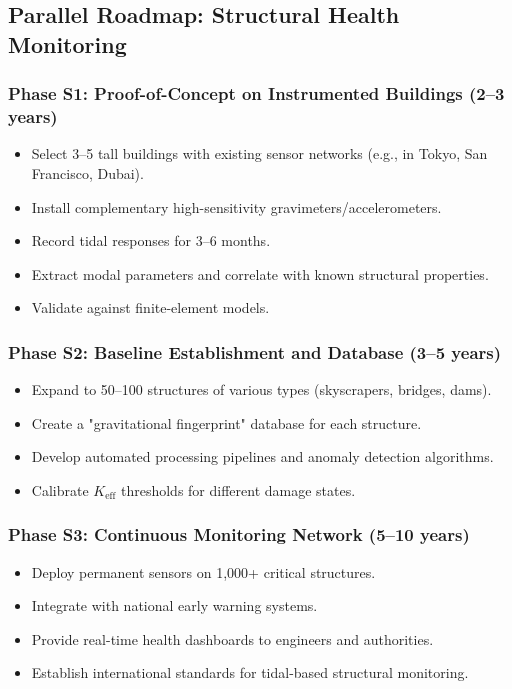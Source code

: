 \documentclass[12pt,a4paper]{article}
\theoremstyle{remark}
\begin{document}
	\subsection{Parallel Roadmap: Structural Health Monitoring}
	
	\subsubsection{Phase S1: Proof-of-Concept on Instrumented Buildings (2–3 years)}
	
	\begin{itemize}
		\item Select 3–5 tall buildings with existing sensor networks (e.g., in Tokyo, San Francisco, Dubai).
		\item Install complementary high-sensitivity gravimeters/accelerometers.
		\item Record tidal responses for 3–6 months.
		\item Extract modal parameters and correlate with known structural properties.
		\item Validate against finite-element models.
	\end{itemize}
	
	\subsubsection{Phase S2: Baseline Establishment and Database (3–5 years)}
	
	\begin{itemize}
		\item Expand to 50–100 structures of various types (skyscrapers, bridges, dams).
		\item Create a "gravitational fingerprint" database for each structure.
		\item Develop automated processing pipelines and anomaly detection algorithms.
		\item Calibrate \(K_{\mathrm{eff}}\) thresholds for different damage states.
	\end{itemize}
	
	\subsubsection{Phase S3: Continuous Monitoring Network (5–10 years)}
	
	\begin{itemize}
		\item Deploy permanent sensors on 1,000+ critical structures.
		\item Integrate with national early warning systems.
		\item Provide real-time health dashboards to engineers and authorities.
		\item Establish international standards for tidal-based structural monitoring.
	\end{itemize}
	
\end{document}
